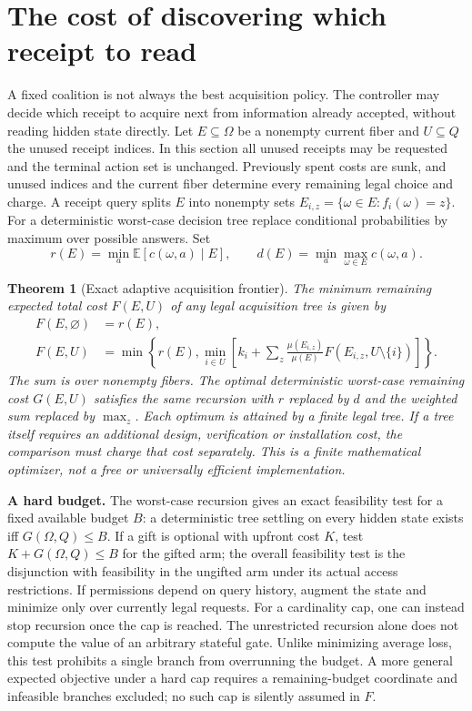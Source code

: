\documentclass[11pt,letterpaper]{article}
\newtheorem{theorem}{Theorem}[section]\newtheorem{proposition}[theorem]{Proposition}\newtheorem{corollary}[theorem]{Corollary}\newtheorem{definition}[theorem]{Definition}
\newcommand{\E}{\mathbb E}\newcommand{\R}{\mathbb R}\newcommand{\N}{\mathbb N}\newcommand{\ind}{\mathbf 1}
\begin{document}
\section{The cost of discovering which receipt to read}
A fixed coalition is not always the best acquisition policy. The controller may decide which receipt to acquire next from information already accepted, without reading hidden state directly. Let $E\subseteq\Omega$ be a nonempty current fiber and $U\subseteq Q$ the unused receipt indices. In this section all unused receipts may be requested and the terminal action set is unchanged. Previously spent costs are sunk, and unused indices and the current fiber determine every remaining legal choice and charge. A receipt query splits $E$ into nonempty sets $E_{i,z}=\{\omega\in E:f_i(\omega)=z\}$. For a deterministic worst-case decision tree replace conditional probabilities by maximum over possible answers. Set
\[
 r(E)=\min_a\E[c(\omega,a)\mid E],\qquad d(E)=\min_a\max_{\omega\in E}c(\omega,a).
\]
\begin{theorem}[Exact adaptive acquisition frontier]\label{thm:bellman}
The minimum remaining expected total cost $F(E,U)$ of any legal acquisition tree is given by
\begin{align*}
 F(E,\varnothing)&=r(E),\\
 F(E,U)&=\min\left\{r(E),\min_{i\in U}\left[k_i+\sum_{z}\frac{\mu(E_{i,z})}{\mu(E)}F(E_{i,z},U\setminus\{i\})\right]\right\}.
\end{align*}
The sum is over nonempty fibers. The optimal deterministic worst-case remaining cost $G(E,U)$ satisfies the same recursion with $r$ replaced by $d$ and the weighted sum replaced by $\max_z$. Each optimum is attained by a finite legal tree. If a tree itself requires an additional design, verification or installation cost, the comparison must charge that cost separately. This is a finite mathematical optimizer, not a free or universally efficient implementation.
\end{theorem}
\textbf{A hard budget.} The worst-case recursion gives an exact feasibility test for a fixed available budget $B$: a deterministic tree settling on every hidden state exists iff $G(\Omega,Q)\le B$. If a gift is optional with upfront cost $K$, test $K+G(\Omega,Q)\le B$ for the gifted arm; the overall feasibility test is the disjunction with feasibility in the ungifted arm under its actual access restrictions. If permissions depend on query history, augment the state and minimize only over currently legal requests. For a cardinality cap, one can instead stop recursion once the cap is reached. The unrestricted recursion alone does not compute the value of an arbitrary stateful gate. Unlike minimizing average loss, this test prohibits a single branch from overrunning the budget. A more general expected objective under a hard cap requires a remaining-budget coordinate and infeasible branches excluded; no such cap is silently assumed in $F$.
\end{document}
